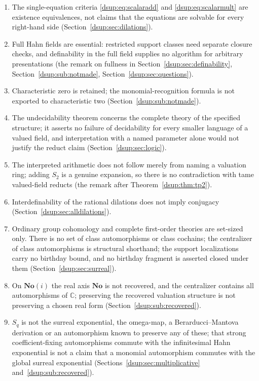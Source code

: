 \documentclass[11pt,oneside]{article}
\numberwithin{equation}{section}
\theoremstyle{definition}
\theoremstyle{remark}
\newcommand{\No}{\mathbf{No}}
\newcommand{\C}{\mathbb C}
\begin{document}
\begin{enumerate}[label=\arabic*.,leftmargin=2.2em,itemsep=2pt]
\item The single-equation criteria \eqref{dsup:eq:scalaradd} and
\eqref{dsup:eq:scalarmult} are existence equivalences, not claims that the
equations are solvable for every right-hand side
(Section~\ref{dsup:sec:dilations}).
\item Full Hahn fields are essential: restricted support classes need
separate closure checks, and definability in the full field supplies no
algorithm for arbitrary presentations (the remark on fullness in
Section~\ref{dsup:sec:definability}, Section~\ref{dsup:sub:notmade},
Section~\ref{dsup:sec:questions}).
\item Characteristic zero is retained; the monomial-recognition formula is
not exported to characteristic two (Section~\ref{dsup:sub:notmade}).
\item The undecidability theorem concerns the complete theory of the
specified structure; it asserts no failure of decidability for every
smaller language of a valued field, and interpretation with a named
parameter alone would not justify the reduct claim
(Section~\ref{dsup:sec:logic}).
\item The interpreted arithmetic does not follow merely from naming a
valuation ring; adding $S_2$ is a genuine expansion, so there is no
contradiction with tame valued-field reducts (the remark after
Theorem~\ref{dsup:thm:tp2}).
\item Interdefinability of the rational dilations does not imply
conjugacy (Section~\ref{dsup:sec:alldilations}).
\item Ordinary group cohomology and complete first-order theories are
set-sized only. There is no set of class automorphisms or class cochains;
the centralizer of class automorphisms is structural shorthand; the
support localizations carry no birthday bound, and no birthday fragment is
asserted closed under them (Section~\ref{dsup:sec:surreal}).
\item On $\No(i)$ the real axis $\No$ is not recovered, and the centralizer
contains all automorphisms of $\C$; preserving the recovered valuation
structure is not preserving a chosen real form
(Section~\ref{dsup:sub:recovered}).
\item $S_q$ is not the surreal exponential, the omega-map, a
Berarducci--Mantova derivation or an automorphism known to preserve any of
these; that strong coefficient-fixing automorphisms commute with the
infinitesimal Hahn exponential is not a claim that a monomial automorphism
commutes with the global surreal exponential (Sections~\ref{dsup:sec:multiplicative} and~\ref{dsup:sub:recovered}).

\end{enumerate}
\end{document}
